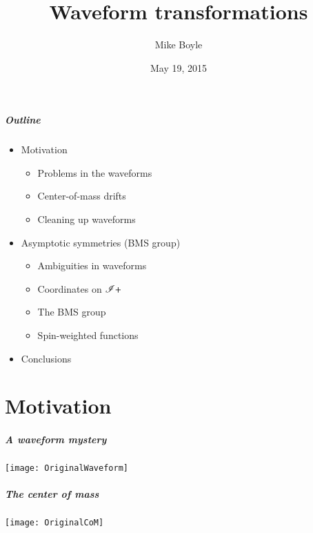 \documentclass[12pt,xcolor={dvipsnames}]{beamer}
\title{Waveform transformations}
\author[Mike Boyle] {Mike Boyle}
\date{May 19, 2015}
\begin{document}
\begin{frame}[plain]
  \titlepage
\end{frame}



\begin{frame}
  \frametitle{Outline}
  \begin{itemize}
  \item Motivation
    \begin{itemize}
    \item Problems in the waveforms
    \item Center-of-mass drifts
    \item Cleaning up waveforms
    \end{itemize}
  \item Asymptotic symmetries (BMS group)
    \begin{itemize}
    \item Ambiguities in waveforms
    \item Coordinates on $\mathscr{I}+$
    \item The BMS group
    \item Spin-weighted functions
    \end{itemize}
  \item Conclusions
  \end{itemize}
\end{frame}



\part{Motivation}
\partpage


\begin{frame}
  \frametitle{A waveform mystery}
  \texttt{[image: OriginalWaveform]}
\end{frame}

\begin{frame}
  \frametitle{The center of mass}
  \texttt{[image: OriginalCoM]}
\end{frame}
\end{document}
